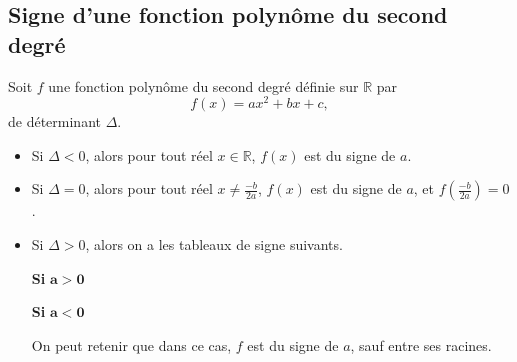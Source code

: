 \documentclass[11pt]{article}
\begin{document}
\subsection{Signe d'une fonction polynôme du second degré}
\begin{prop}
  Soit $f$ une fonction polynôme du second degré définie sur $\mathbb{R}$ par
  \[
    f(x)=ax^2+bx+c,
  \]
  de déterminant $\Delta$.
  \begin{itemize}
    \item Si $\Delta<0$, alors pour tout réel $x\in\mathbb{R}$, $f(x)$ est du
      signe de $a$.
    \item Si $\Delta=0$, alors pour tout réel $x\neq\frac{-b}{2a}$, $f(x)$ est
      du signe de $a$, et $f(\frac{-b}{2a})=0$.
    \item Si $\Delta>0$, alors on a les tableaux de signe suivants.

      \noindent
  \begin{minipage}[t]{.47\textwidth}
    \begin{center}
      {\bf Si} $\mathbf{a>0}$\vspace{.2cm}

    \end{center}
  \vspace{.2cm}
  \end{minipage}
    \hfill
  \begin{minipage}[t]{.47\textwidth}
    \begin{center}
      {\bf Si} $\mathbf{a<0}$\vspace{.2cm}

    \end{center}
  \vspace{.2cm}
  \end{minipage}
  On peut retenir que dans ce cas, $f$ est du signe de $a$, sauf entre ses
  racines.
  \end{itemize}
\end{prop}
\end{document}
